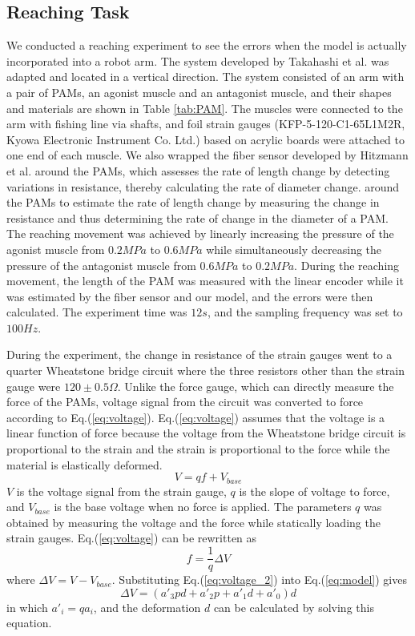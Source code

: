 \subsection{Reaching Task}
We conducted a reaching experiment to see the errors when the model is actually incorporated into a robot arm. The system developed by Takahashi et al.\cite{takahashi} was adapted and located in a vertical direction. The system consisted of an arm with a pair of PAMs, an agonist muscle and an antagonist muscle, and their shapes and materials are shown in Table \ref{tab:PAM}. The muscles were connected to the arm with fishing line via shafts, and foil strain gauges (KFP-5-120-C1-65L1M2R, Kyowa Electronic Instrument Co. Ltd.) based on acrylic boards were attached to one end of each muscle.
We also wrapped the fiber sensor developed by Hitzmann et al. \cite{fiber} around the PAMs, which assesses the rate of length change by detecting variations in resistance, thereby calculating the rate of diameter change. around the PAMs to estimate the rate of length change by measuring the change in resistance and thus determining the rate of change in the diameter of a PAM.
The reaching movement was achieved by linearly increasing the pressure of the agonist muscle from $0.2 \si{MPa}$ to $0.6 \si{MPa}$ while simultaneously decreasing the pressure of the antagonist muscle from $0.6 \si{MPa}$ to $0.2 \si{MPa}$. During the reaching movement, the length of the PAM was measured with the linear encoder while it was estimated by the fiber sensor and our model, and the errors were then calculated. The experiment time was $12 \si{s}$, and the sampling frequency was set to $100 \si{Hz}$.

During the experiment, the change in resistance of the strain gauges went to a quarter Wheatstone bridge circuit where the three resistors other than the strain gauge were $120 \pm 0.5 \Omega$. Unlike the force gauge, which can directly measure the force of the PAMs, voltage signal from the circuit was converted to force according to Eq.(\ref{eq:voltage}). Eq.(\ref{eq:voltage}) assumes that the voltage is a linear function of force because the voltage from the Wheatstone bridge circuit is proportional to the strain\cite{wheatstone} and the strain is proportional to the force while the material is elastically deformed.
\begin{equation}
    \label{eq:voltage}
    V=qf+V_{base}
\end{equation}
$V$ is the voltage signal from the strain gauge, $q$ is the slope of voltage to force, and $V_{base}$ is the base voltage when no force is applied.
The parameters $q$ was obtained by measuring the voltage and the force while statically loading the strain gauges.
Eq.(\ref{eq:voltage}) can be rewritten as 
\begin{equation}
    \label{eq:voltage_2}
    f = \frac{1}{q}\Delta V
\end{equation}
where $\Delta V = V - V_{base}$. Substituting Eq.(\ref{eq:voltage_2}) into Eq.(\ref{eq:model}) gives
\begin{equation}
    \label{eq:model_voltage}
    \Delta V = (a'_3pd + a'_2p + a'_1d + a'_0)d
\end{equation}
in which $a'_i=qa_i$, and the deformation $d$ can be calculated by solving this equation.

